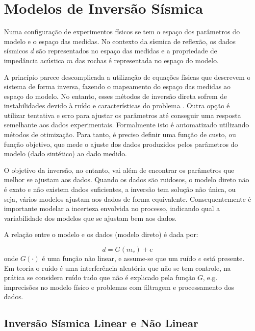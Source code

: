 \chapter{Modelos de Inversão Sísmica}
\label{cap:2modelosSuperresolucao}


Numa configuração de experimentos físicos se tem o espaço dos parâmetros do
modelo e o espaço das medidas. No contexto da sísmica de reflexão, os dados
sísmicos $d$ são representados no espaço das medidas e a propriedade de
impedância acústica $m$ das rochas é representada no espaço do modelo.

A princípio parece descomplicada a utilização de equações físicas que descrevem
o sistema de forma inversa, fazendo o mapeamento do espaço das medidas ao espaço
do modelo. No entanto, esses métodos de inversão direta sofrem de instabilidades
devido à ruído e características do problema \citep[p. 50]{sen_livro}. Outra
opção é utilizar tentativa e erro para ajustar os parâmetros até conseguir uma
resposta semelhante aos dados experimentais. Formalmente isto é automatizado
utilizando métodos de otimização. Para tanto, é preciso definir uma função de
custo, ou função objetivo, que mede o ajuste dos dados produzidos pelos
parâmetros do modelo (dado sintético) ao dado medido.

O objetivo da inversão, no entanto, vai além de encontrar os parâmetros que
melhor se ajustam aos dados. Quando os dados são ruidosos, o modelo direto não é
exato e não existem dados suficientes, a inversão tem solução não única, ou
seja, vários modelos ajustam aos dados de forma equivalente. Consequentemente é
importante modelar a incerteza envolvida no processo, indicando qual a
variabilidade dos modelos que se ajustam bem aos dados.

A relação entre o modelo e os dados (modelo direto) é dada por:

\begin{equation}
d = G(m_v) + e
\end{equation}
onde $G(\cdot)$ é uma função não linear, e assume-se que um ruído $e$ está
presente. Em teoria o ruído é uma interferência aleatória que não se tem
controle, na prática se considera ruído tudo que não é explicado pela função
$G$, e.g. imprecisões no modelo físico e problemas com filtragem e processamento
dos dados.

\section{Inversão Sísmica Linear e Não Linear}

